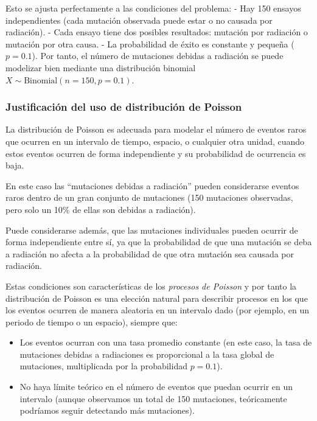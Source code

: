 \documentclass[
]{article}
\providecommand{\tightlist}{%
  \setlength{\itemsep}{0pt}\setlength{\parskip}{0pt}}
\begin{document}
Esto se ajusta perfectamente a las condiciones del problema:
- Hay 150 ensayos independientes (cada mutación observada puede estar o no causada por radiación).
- Cada ensayo tiene dos posibles resultados: mutación por radiación o mutación por otra causa.
- La probabilidad de éxito es constante y pequeña (\(p = 0.1\)).
Por tanto, el número de mutaciones debidas a radiación se puede modelizar bien mediante una distribución binomial \(X \sim \text{Binomial}(n = 150, p = 0.1)\).

\subsubsection{Justificación del uso de distribución de Poisson}\label{justificaciuxf3n-del-uso-de-distribuciuxf3n-de-poisson}

La distribución de Poisson es adecuada para modelar el número de eventos raros que ocurren en un intervalo de tiempo, espacio, o cualquier otra unidad, cuando estos eventos ocurren de forma independiente y su probabilidad de ocurrencia es baja.

En este caso las ``mutaciones debidas a radiación'' pueden considerarse eventos raros dentro de un gran conjunto de mutaciones (150 mutaciones observadas, pero solo un 10\% de ellas son debidas a radiación).

Puede considerarse además, que las mutaciones individuales pueden ocurrir de forma independiente entre sí, ya que la probabilidad de que una mutación se deba a radiación no afecta a la probabilidad de que otra mutación sea causada por radiación.

Estas condiciones son características de los \emph{procesos de Poisson} y por tanto la distribución de Poisson es una elección natural para describir procesos en los que los eventos ocurren de manera aleatoria en un intervalo dado (por ejemplo, en un periodo de tiempo o un espacio), siempre que:

\begin{itemize}
\tightlist
\item
  Los eventos ocurran con una tasa promedio constante (en este caso, la tasa de mutaciones debidas a radiaciones es proporcional a la tasa global de mutaciones, multiplicada por la probabilidad \(p = 0.1\)).
\item
  No haya límite teórico en el número de eventos que puedan ocurrir en un intervalo (aunque observamos un total de 150 mutaciones, teóricamente podríamos seguir detectando más mutaciones).
\end{itemize}
\end{document}
